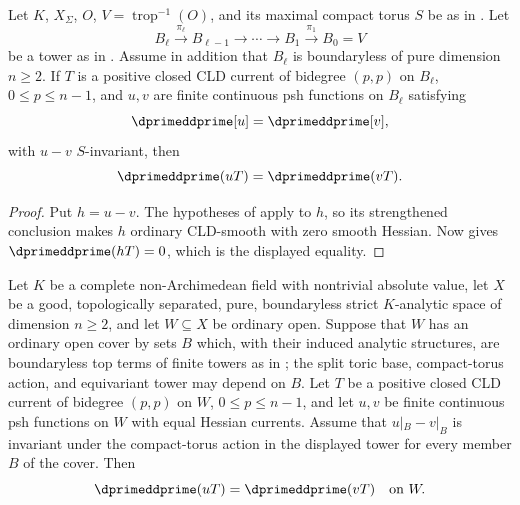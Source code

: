 \begin{corollary}
\label{cor:p213-invariant-toric-open-polydisc-tower-bt}
Let \(K\), \(X_\Sigma\), \(O\), \(V=\operatorname{trop}^{-1}(O)\), and its
maximal compact torus \(S\) be as in
.  Let
\[
 B_\ell\xrightarrow{\pi_\ell}B_{\ell-1}
 \longrightarrow\cdots\longrightarrow B_1
 \xrightarrow{\pi_1}B_0=V
\]
be a tower as in
.  Assume in
addition that \(B_\ell\) is boundaryless of pure dimension \(n\geq2\).  If
\(T\) is a positive closed CLD current of bidegree \((p,p)\) on \(B_\ell\),
\(0\leq p\leq n-1\), and \(u,v\) are finite continuous psh functions on
\(B_\ell\) satisfying
\[
                         \dprimeddprime[u]=\dprimeddprime[v],
\]
with \(u-v\) \(S\)-invariant, then
\[
                 \dprimeddprime(uT)=\dprimeddprime(vT).
\]
\end{corollary}

\begin{proof}
Put \(h=u-v\).  The hypotheses of
 apply to
\(h\), so its strengthened conclusion makes \(h\) ordinary CLD-smooth with
zero smooth Hessian.  Now  gives
\(\dprimeddprime(hT)=0\), which is the displayed equality.
\end{proof}

\begin{corollary}
\label{cor:p213-invariant-toric-open-polydisc-tower-cover-bt}
Let \(K\) be a complete non-Archimedean field with nontrivial absolute
value, let \(X\) be a good, topologically separated, pure,
boundaryless strict \(K\)-analytic space of dimension \(n\geq2\), and let
\(W\subseteq X\) be ordinary open.  Suppose that \(W\) has an ordinary
open cover by sets \(B\) which, with their induced analytic structures, are
boundaryless top terms of finite towers as in
; the split
toric base, compact-torus action, and equivariant tower may depend on
\(B\).  Let \(T\) be a positive closed CLD current of bidegree \((p,p)\)
on \(W\), \(0\leq p\leq n-1\), and let \(u,v\) be finite continuous psh
functions on \(W\) with equal Hessian currents.  Assume that \(u|_B-v|_B\)
is invariant under the compact-torus action in the displayed tower for every
member \(B\) of the cover.  Then
\[
                 \dprimeddprime(uT)=\dprimeddprime(vT)
                 \quad\text{on }W.
\]
\end{corollary}

